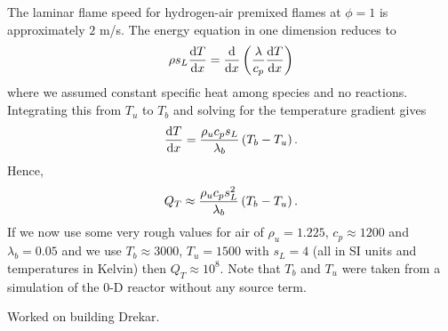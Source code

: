 The laminar flame speed for hydrogen-air premixed flames at $\phi = 1$ is approximately $2$ m/s.  The energy equation in one dimension reduces to
\begin{align}
  \rho s_{L}\frac{\mathrm{d} T}{\mathrm{d} x} = \frac{\mathrm{d} }{\mathrm{d} x}\left(\frac{\lambda}{c_{p}} \frac{\mathrm{d} T}{\mathrm{d} x}\right)
\end{align}
where we assumed constant specific heat among species and no reactions.  Integrating this from $T_{u}$ to $T_{b}$ and solving for the temperature gradient gives
\begin{align}
  \frac{\mathrm{d} T}{\mathrm{d} x} = \frac{\rho_{u}c_{p}s_{L}}{\lambda_{b}}\left(T_{b}-T_{u}\right).
\end{align}
Hence,
\begin{align}
  Q_{T} \approx \frac{\rho_{u}c_{p}s_{L}^{2}}{\lambda_{b}}\left(T_{b}-T_{u}\right).
\end{align}
If we now use some very rough values for air of $\rho_{u} = 1.225$, $c_{p} \approx 1200$ and $\lambda_{b}=0.05$ and we use $T_{b}\approx 3000$, $T_{u} = 1500$ with $s_{L}=4$ (all in SI units and temperatures in Kelvin) then $Q_{T}\approx 10^{8}$.  Note that $T_{b}$ and $T_{u}$ were taken from a simulation of the 0-D reactor without any source term.

Worked on building Drekar.




